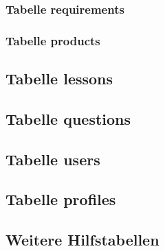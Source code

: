 \subsubsection{Tabelle requirements}
\subsubsection{Tabelle products}
\subsection{Tabelle lessons}
\subsection{Tabelle questions}
\subsection{Tabelle users}
\subsection{Tabelle profiles}
\subsection{Weitere Hilfstabellen}